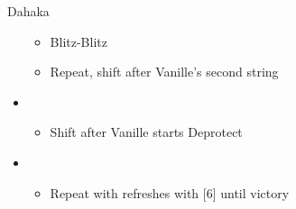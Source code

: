 \begin{battle}[1:30]{Dahaka}
\begin{itemize}
\begin{itemize}
				      \item Blitz-Blitz
				      \item Repeat, shift after Vanille's second string
			      \end{itemize}
			\item \fifth
			      \begin{itemize}
				      \item Shift after Vanille starts Deprotect
			      \end{itemize}
			\item \fourth
			      \begin{itemize}
				      \item Repeat with refreshes with [6] until victory
			      \end{itemize}
		\end{itemize}
	\end{battle}
	\vfill
